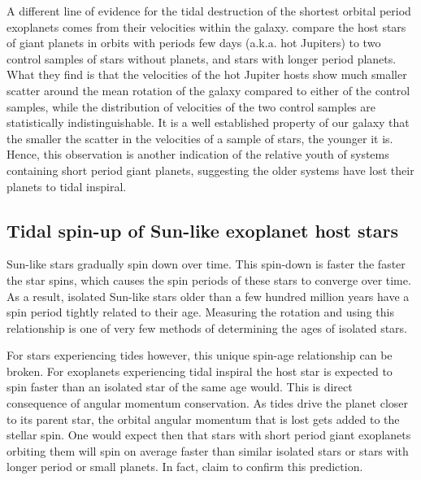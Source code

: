 A different line of evidence for the tidal destruction of the shortest orbital
period exoplanets comes from their velocities within the galaxy.
\citet{Hamer_Schlaufman_19} compare the host stars of giant planets in orbits
with periods few days (a.k.a.  hot Jupiters) to two control samples of stars
without planets, and stars with longer period planets. What they find is that
the velocities of the hot Jupiter hosts show much smaller scatter around the
mean rotation of the galaxy compared to either of the control samples, while the
distribution of velocities of the two control samples are statistically
indistinguishable. It is a well established property of our galaxy that the
smaller the scatter in the velocities of a sample of stars, the younger it is.
Hence, this observation is another indication of the relative youth of systems
containing short period giant planets, suggesting the older systems have lost
their planets to tidal inspiral.

\subsection{Tidal spin-up of Sun-like exoplanet host stars}

Sun-like stars gradually spin down over time. This spin-down is faster the
faster the star spins, which causes the spin periods of these stars to converge
over time. As a result, isolated Sun-like stars older than a few hundred million
years have a spin period tightly related to their age. Measuring the rotation
and using this relationship is one of very few methods of determining the ages
of isolated stars.

For stars experiencing tides however, this unique spin-age relationship can be
broken. For exoplanets experiencing tidal inspiral the host star is expected to
spin faster than an isolated star of the same age would. This is direct
consequence of angular momentum conservation. As tides drive the planet closer
to its parent star, the orbital angular momentum that is lost gets added to the
stellar spin. One would expect then that stars with short period giant
exoplanets orbiting them will spin on average faster than similar isolated stars
or stars with longer period or small planets. In fact, \citet{Tajeda_et_al_21}
claim to confirm this prediction.

